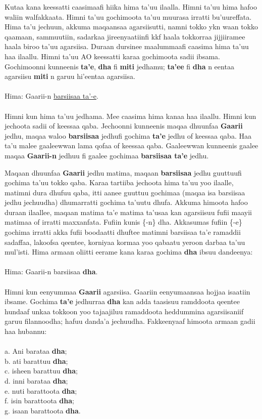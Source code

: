 \documentclass[11pt,b5paper]{book}
\begin{document}
Kutaa kana keessatti caasimaafi hiika hima ta’uu  ilaalla. Himni ta’uu hima hafoo waliin walfakkaata. Himni ta’uu gochimoota ta’uu muurasa irratti bu’uureffata. Hima ta’u jechuun, akkuma maqaansaa agarsiisutti, namni tokko ykn waan tokko qaamaan, sammuutiin, sadarkaa jireenyaatiinfi kkf haala tokkorraa jijjiiramee haala biroo ta’uu agarsiisa. Duraan dursinee maalummaafi caasima hima ta’uu
haa ilaallu. Himni ta’uu AO keessatti karaa gochimoota sadii ibsama. Gochimoonni kunneenis \textbf{ta’e}, \textbf{dha} fi \textbf{miti} jedhamu; \textbf{ta’ee} fi \textbf{dha} n eentaa agarsiisu \textbf{miti} n garuu hi'eentaa agarsiisa. \\
\\
Hima: Gaarii-n \underline{barsiisaa ta’-e}. \\
\\

Himni kun hima ta’uu jedhama. Mee caasima hima kanaa haa ilaallu. Himni kun jechoota sadii of
keessaa qaba. Jechoonni kunneenis maqaa dhuunfaa \textbf{Gaarii} jedhu, maqaa waloo \textbf{barsiisaa} jedhufi gochima \textbf{ta’e} jedhu of keessaa qaba. Haa ta’u malee gaaleewwan lama qofaa of keessaa qaba. Gaaleewwan kunneenis gaalee maqaa \textbf{Gaarii-n} jedhuu fi gaalee gochimaa \textbf{barsiisaa ta’e} jedhu.

Maqaan dhuunfaa \textbf{Gaarii} jedhu matima, maqaan \textbf{barsiisaa} jedhu guuttuufi gochima ta’uu tokko qaba. Karaa tartiiba jechoota hima ta’uu yoo ilaalle, matimni dura dhufuu qaba, itti
aanee guuttuu gochimaa (maqaa isa barsiisaa jedhu jechuudha) dhumarratti gochima ta’uutu dhufa. Akkuma himoota hafoo duraan ilaallee, maqaan matima ta’e matima ta’usaa kan agarsiisuu fufii maayii matimaa of irratti maxxanfata. Fufiin kunis \{-n\} dha. Akkasumas fufiin \{-e\} gochima irratti akka fufii
boodaatti dhuftee matimni barsiisaa ta’e ramaddii sadaffaa, lakoofsa qeentee, korniyaa kormaa yoo qabaatu yeroon darbaa ta’uu mul’isti. Hima armaan oliitti eerame kana karaa gochima
\textbf{dha} ibsuu dandeenya: \\
\\
Hima: Gaarii-n barsiisaa \textbf{dha}.\\
\\

Himni kun eenyummaa \textbf{Gaarii} agarsiisa. Gaariin eenyumaansaa hojjaa isaatiin ibsame. Gochima \textbf{ta’e} jedhurraa \textbf{dha} kan adda taasisuu ramddoota qeentee hundaaf unkaa tokkoon yoo
tajaajiluu ramaddoota heddummina agarsiisaniif garuu filannoodha; hafuu danda’a jechuudha. Fakkeenyaaf himoota armaan gadii haa hubannu: \\
\\
a. Ani barataa \textbf{dha}; \\
b. ati barattuu \textbf{dha}; \\
c. isheen barattuu \textbf{dha}; \\
d. inni barataa \textbf{dha}; \\
e. nuti barattoota \textbf{dha}; \\
f. isin barattoota \textbf{dha}; \\
g. isaan barattoota \textbf{dha}.
\end{document}
